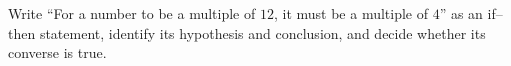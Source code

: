 Write ``For a number to be a multiple of $12$, it must be a multiple of $4$'' as an if--then statement, identify its hypothesis and conclusion, and decide whether its converse is true.
